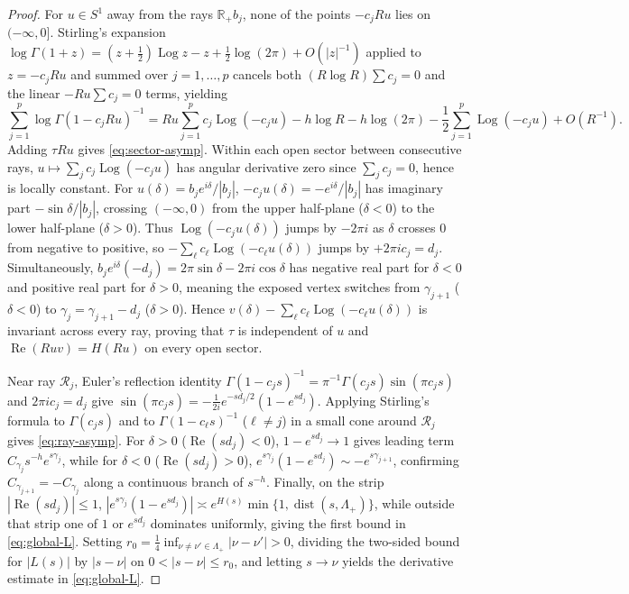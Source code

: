 \documentclass[11pt,reqno]{amsart}
\theoremstyle{definition}
\theoremstyle{remark}
\newcommand{\R}{\mathbb{R}}
\DeclareMathOperator{\Log}{Log}
\DeclareMathOperator{\dist}{dist}
\begin{document}
\begin{proof}
For $u \in S^1$ away from the rays $\R_+ b_j$, none of the points $-c_j R u$ lies on $(-\infty,0]$. Stirling's expansion $\log \Gamma(1+z) = (z+\frac12)\Log z - z + \frac12\log(2\pi) + O(|z|^{-1})$ applied to $z = -c_j R u$ and summed over $j = 1,\dots,p$ cancels both $(R\log R)\sum c_j = 0$ and the linear $-R u \sum c_j = 0$ terms, yielding
\[
  \sum_{j=1}^p \log \Gamma(1 - c_j R u)^{-1}
  = R u \sum_{j=1}^p c_j \Log(-c_j u) - h \log R - h\log(2\pi) - \frac{1}{2}\sum_{j=1}^p \Log(-c_j u) + O(R^{-1}).
\]
Adding $\tau R u$ gives \eqref{eq:sector-asymp}. Within each open sector between consecutive rays, $u \mapsto \sum_j c_j \Log(-c_j u)$ has angular derivative zero since $\sum_j c_j = 0$, hence is locally constant. For $u(\delta) = b_j e^{i\delta}/|b_j|$, $-c_j u(\delta) = -e^{i\delta}/|b_j|$ has imaginary part $-\sin\delta/|b_j|$, crossing $(-\infty,0)$ from the upper half-plane ($\delta < 0$) to the lower half-plane ($\delta > 0$). Thus $\Log(-c_j u(\delta))$ jumps by $-2\pi i$ as $\delta$ crosses $0$ from negative to positive, so $-\sum_\ell c_\ell \Log(-c_\ell u(\delta))$ jumps by $+2\pi i c_j = d_j$. Simultaneously, $b_j e^{i\delta}(-d_j) = 2\pi\sin\delta - 2\pi i\cos\delta$ has negative real part for $\delta < 0$ and positive real part for $\delta > 0$, meaning the exposed vertex switches from $\gamma_{j+1}$ ($\delta < 0$) to $\gamma_j = \gamma_{j+1} - d_j$ ($\delta > 0$). Hence $v(\delta) - \sum_\ell c_\ell \Log(-c_\ell u(\delta))$ is invariant across every ray, proving that $\tau$ is independent of $u$ and $\operatorname{Re}(R u v) = H(R u)$ on every open sector.

Near ray $\mathcal{R}_j$, Euler's reflection identity $\Gamma(1 - c_j s)^{-1} = \pi^{-1}\Gamma(c_j s)\sin(\pi c_j s)$ and $2\pi i c_j = d_j$ give $\sin(\pi c_j s) = -\frac{1}{2i} e^{-s d_j/2}(1 - e^{s d_j})$. Applying Stirling's formula to $\Gamma(c_j s)$ and to $\Gamma(1 - c_\ell s)^{-1}$ ($\ell \ne j$) in a small cone around $\mathcal{R}_j$ gives \eqref{eq:ray-asymp}. For $\delta > 0$ ($\operatorname{Re}(s d_j) < 0$), $1 - e^{s d_j} \to 1$ gives leading term $C_{\gamma_j} s^{-h} e^{s\gamma_j}$, while for $\delta < 0$ ($\operatorname{Re}(s d_j) > 0$), $e^{s\gamma_j}(1 - e^{s d_j}) \sim -e^{s\gamma_{j+1}}$, confirming $C_{\gamma_{j+1}} = -C_{\gamma_j}$ along a continuous branch of $s^{-h}$. Finally, on the strip $|\operatorname{Re}(s d_j)| \le 1$, $|e^{s\gamma_j}(1 - e^{s d_j})| \asymp e^{H(s)}\min\{1,\dist(s,\Lambda_+)\}$, while outside that strip one of $1$ or $e^{s d_j}$ dominates uniformly, giving the first bound in \eqref{eq:global-L}. Setting $r_0 = \frac14\inf_{\nu\ne\nu'\in\Lambda_+} |\nu - \nu'| > 0$, dividing the two-sided bound for $|L(s)|$ by $|s - \nu|$ on $0 < |s - \nu| \le r_0$, and letting $s \to \nu$ yields the derivative estimate in \eqref{eq:global-L}.
\end{proof}
\end{document}
